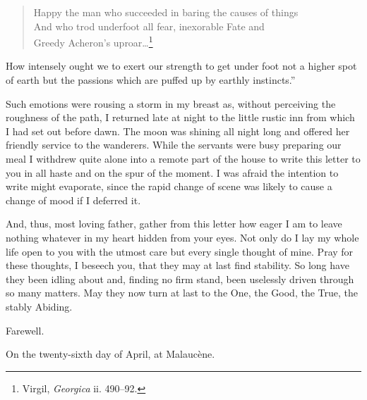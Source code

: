 \begin{quote} Happy the man who succeeded in baring the causes of
things\\ And who trod underfoot all fear, inexorable Fate and\\ Greedy
Acheron's uproar\ldots\footnote{Virgil, \textit{Georgica} ii.
490--92.} \end{quote}

\noindent How intensely ought we to exert our strength to get under
foot not a higher spot of earth but the passions which are puffed up
by earthly instincts.''

Such emotions were rousing a storm in my breast as, without perceiving
the roughness of the path, I returned late at night to the little
rustic inn from which I had set out before dawn. The moon was shining
all night long and offered her friendly service to the wanderers.
While the servants were busy preparing our meal I withdrew quite alone
into a remote part of the house to write this letter to you in all
haste and on the spur of the moment. I was afraid the intention to
write might evaporate, since the rapid change of scene was likely to
cause a change of mood if I deferred it.

And, thus, most loving father, gather from this letter how eager I am
to leave nothing whatever in my heart hidden from your eyes. Not only
do I lay my whole life open to you with the utmost care but every
single thought of mine. Pray for these thoughts, I beseech you, that
they may at last find stability. So long have they been idling about
and, finding no firm stand, been uselessly driven through so many
matters. May they now turn at last to the One, the Good, the True, the
stably Abiding.

Farewell.

On the twenty-sixth day of April, at Malauc\`{e}ne.

